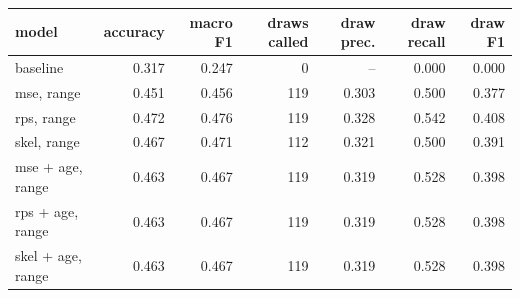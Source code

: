 
\begin{tabular}{lrrrrrr}
\toprule
model & accuracy & macro F1 & draws called & draw prec. & draw recall & draw F1\\
\midrule
baseline & 0.317 & 0.247 & 0 & -- & 0.000 & 0.000\\
mse, range & 0.451 & 0.456 & 119 & 0.303 & 0.500 & 0.377\\
rps, range & 0.472 & 0.476 & 119 & 0.328 & 0.542 & 0.408\\
skel, range & 0.467 & 0.471 & 112 & 0.321 & 0.500 & 0.391\\
mse + age, range & 0.463 & 0.467 & 119 & 0.319 & 0.528 & 0.398\\
rps + age, range & 0.463 & 0.467 & 119 & 0.319 & 0.528 & 0.398\\
skel + age, range & 0.463 & 0.467 & 119 & 0.319 & 0.528 & 0.398\\
\bottomrule
\end{tabular}
